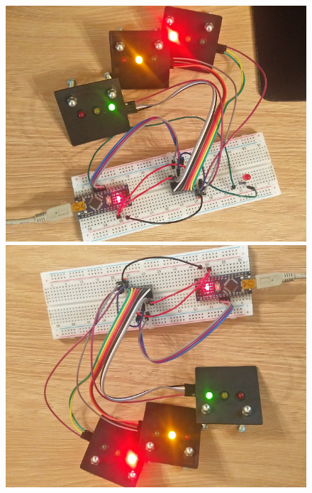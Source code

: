 \documentclass[a4paper,12pt]{article}
\begin{document}
\begin{figure}[htp]
    \centering
    \begin{minipage}{0.32\textwidth}
        \centering
        \includegraphics[width=\linewidth]{images/sm_test_1.png}
    \end{minipage}\hfill
    \begin{minipage}{0.32\textwidth}
        \centering
        \includegraphics[width=\linewidth]{images/sm_test_2.png}
    \end{minipage}\hfill
    \begin{minipage}{0.32\textwidth}
        \centering

\end{minipage}
\end{figure}
\end{document}
